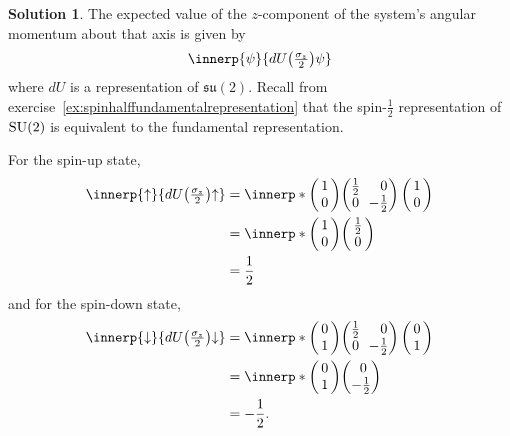 \documentclass[11pt, a4paper]{report}
\theoremstyle{definition}
\newtheorem{solution}{Solution}[part]
\newenvironment{sol}{\begin{solution}}{\end{solution}\pagebreak[3]}
\newcommand*{\m}{\ensuremath\:\, \mathllap{-}}
\newcommand*{\SU}{\ensuremath\text{SU}}
\begin{document}
\begin{sol}

The expected value of the $z$-component of the system's angular momentum about that axis is given by
\[
    \innerp{\psi}{dU\bigl(\tfrac{\sigma_z}{2}\bigr) \psi}
\]
where $dU$ is a representation of $\mathfrak{su}(2)$.
Recall from exercise~\ref{ex:spinhalffundamentalrepresentation} that the spin-$\frac{1}{2}$ representation of $\SU(2)$ is equivalent to the fundamental representation.

For the spin-up state,
\begin{align*}
    \innerp{\uparrow}{dU\bigl(\tfrac{\sigma_z}{2}\bigr) {\uparrow}}
        &= \innerp*{\begin{pmatrix}
                \,1\, \\ 0
            \end{pmatrix}}
            {\begin{pmatrix}
                \tfrac{1}{2} & \phantom{\m}0 \\
                0            & \m \tfrac{1}{2}
            \end{pmatrix}
            \begin{pmatrix}
                \,1\, \\ 0
            \end{pmatrix}} \\
    &= \innerp*{\begin{pmatrix}
                \,1\, \\ 0
            \end{pmatrix}}
            {\begin{pmatrix}
                \,\tfrac{1}{2}\, \\ 0
            \end{pmatrix}} \\
    &= \frac{1}{2}
\end{align*}
and for the spin-down state,
\begin{align*}
    \innerp{\downarrow}{dU\bigl(\tfrac{\sigma_z}{2}\bigr) {\downarrow}}
        &= \innerp*{\begin{pmatrix}
                \,0\, \\ 1
            \end{pmatrix}}
            {\begin{pmatrix}
                \tfrac{1}{2} & \phantom{\m}0 \\
                0            & \m \tfrac{1}{2}
            \end{pmatrix}
            \begin{pmatrix}
                \,0\, \\ 1
            \end{pmatrix}} \\
    &= \innerp*{\begin{pmatrix}
                \,0\, \\ 1
            \end{pmatrix}}
            {\begin{pmatrix}
                \,\, 0 \\ -\tfrac{1}{2}
            \end{pmatrix}} \\
    &= -\frac{1}{2}.
\end{align*}


\end{sol}
\end{document}
